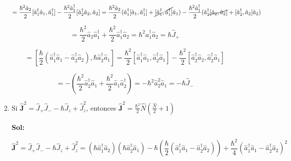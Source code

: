 \documentclass[12pt,a4paper]{article}
\begin{document}
\begin{enumerate}
\begin{enumerate}
    \begin{equation*}
        = \frac{\hbar^2 \hat{a}_2}{2} [\hat{a}_{1}^{\dagger} \hat{a}_{1}, \hat{a}_{1}^{\dagger}] - \frac{\hbar^2 \hat{a}_{1}^{\dagger}}{2} [\hat{a}_{2}^{\dagger}\hat{a}_{2},\hat{a}_{2}] = \frac{\hbar^2 \hat{a}_2}{2}(\hat{a}_{1}^{\dagger}[\hat{a}_1,\hat{a}_{1}^{\dagger}] + \cancel{[\hat{a}_{1}^{\dagger}, \hat{a}_{1}^{\dagger}]}\hat{a}_1) - \frac{\hbar^2 \hat{a}_{1}^{\dagger}}{2}(\hat{a}_{2}^{\dagger}\cancel{[\hat{a}_2,\hat{a}_2]}+[\hat{a}_{2}^{\dagger}, \hat{a}_2] \hat{a}_2)
    \end{equation*}
    
    \begin{equation*}
        = \frac{\hbar^2}{2} \hat{a}_2 \hat{a}_{1}^{\dagger} + \frac{\hbar^2}{2} \hat{a}_{1}^{\dagger} \hat{a}_2 = \hbar^2 \hat{a}_{1}^{\dagger} \hat{a}_2 = \hbar \hat{J}_{+}
    \end{equation*}
    
    \begin{equation*}
        [\hat{J}_z , \hat{J}_{-}] = [\frac{\hbar}{2}(\hat{a}_{1}^{\dagger}\hat{a}_1 - \hat{a}_{2}^{\dagger}\hat{a}_{2}), \hbar \hat{a}_{2}^{\dagger} \hat{a}_{1} ] = \frac{\hbar^2}{2}[\hat{a}_{1}^{\dagger}\hat{a}_{1}, \hat{a}_{2}^{\dagger}\hat{a}_{1}] - \frac{\hbar^2}{2}[\hat{a}_{2}^{\dagger}\hat{a}_{2},\hat{a}_{2}^{\dagger}\hat{a}_{1}]
    \end{equation*}
    
    \begin{equation*}
        = -\left(\frac{\hbar^2}{2} \hat{a}_{2}^{\dagger} \hat{a}_{1} + \frac{\hbar^2}{2}\hat{a}_{1}\hat{a}_{2}^{\dagger}\right) = -\hbar^2 \hat{a}_{2}^{2} \hat{a}_{1} = - \hbar \hat{J}_{-}
    \end{equation*}
    
    
    \item Si $\mathbf{\hat{J}}^2 = \hat{J}_{+}\hat{J}_{-} - \hbar \hat{J}_{z} + \hat{J}_{z}^2$, entonces $\mathbf{\hat{J}}^2 = \frac{\hbar^2}{2}\hat{N}(\frac{\hat{N}}{2} + 1)$
    
    
    \textbf{Sol:}
    
    \begin{equation*}
        \mathbf{\hat{J}}^2 = \hat{J}_{+}\hat{J}_{-} - \hbar \hat{J}_{z} + \hat{J}_{z}^2 = (\hbar \hat{a}_{1}^{\dagger} \hat{a}_{2})(\hbar \hat{a}_{2}^{\dagger} \hat{a}_{1}) - \hbar \left(\frac{\hbar}{2}(\hat{a}_{1}^{\dagger} \hat{a}_{1} - \hat{a}_{2}^{\dagger} \hat{a}_{2})\right) + \frac{\hbar^2}{4}(\hat{a}_{1}^{\dagger}\hat{a}_{1} - \hat{a}_{2}^{\dagger} \hat{a}_{2})^2
    \end{equation*}
    

\end{enumerate}
\end{enumerate}
\end{document}
